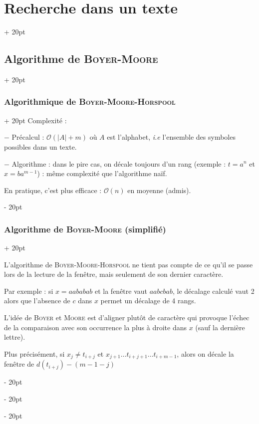 \documentclass[a4paper, 12pt, twoside]{article}
\newcommand{\lr}[1]{\left( #1 \right)}
\newcommand{\abs}[1]{\left\lvert #1 \right\rvert}
\newcommand{\ind}[1][20pt]{\advance\leftskip + #1}
\newcommand{\deind}[1][20pt]{\advance\leftskip - #1}
\newenvironment{indt}[2][20pt]{#2 \par \ind[#1]}{\par \deind} %
\begin{document}
\begin{indt}{\section{Recherche dans un texte}}
\begin{indt}{\subsection{Algorithme de \textsc{Boyer-Moore}}}
\begin{indt}{\subsubsection{Algorithmique de \textsc{Boyer-Moore-Horspool}}}
                Complexité :

                $-$ Précalcul : $\mathcal O\!\lr{\abs A + m}$ où $A$ est l'alphabet, \textit{i.e} l'ensemble des symboles possibles dans un texte.

                $-$ Algorithme : dans le pire cas, on décale toujours d'un rang (exemple : $t = a^n$ et $x = ba^{m - 1}$) : même complexité que l'algorithme naïf.

                En pratique, c'est plus efficace : $\mathcal O(n)$ en moyenne (admis).
            \end{indt}

            \vspace{12pt}
            
            \begin{indt}{\subsubsection{Algorithme de \textsc{Boyer-Moore} (simplifié)}}
                \label{1.2.3}
                
                L'algorithme de \textsc{Boyer-Moore-Horspool} ne tient pas compte de ce qu'il se passe lors de la lecture de la fenêtre, mais seulement de son dernier caractère.

                Par exemple : si $x = aababab$ et la fenêtre vaut $aabcbab$, le décalage calculé vaut 2 alors que l'absence de $c$ dans $x$ permet un décalage de 4 rangs.

                L'idée de \textsc{Boyer} et \textsc{Moore} est d'aligner plutôt de caractère qui provoque l'échec de la comparaison avec son occurrence la plus à droite dans $x$ (sauf la dernière lettre).

                Plus précisément, si $x_j \neq t_{i + j}$ et $x_{j + 1} \ldots t_{i + j + 1} \ldots t_{i + m - 1}$, alors on décale la fenêtre de $d(t_{i + j}) - (m - 1 - j)$

                \begin{center}
\end{center}
\end{indt}
\end{indt}
\end{indt}
\end{document}
